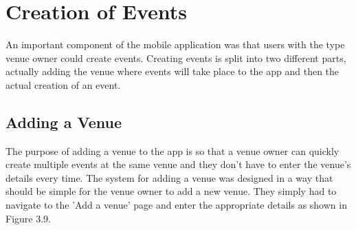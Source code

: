 \section{Creation of Events}
An important component of the mobile application was that users with the type venue owner could create events. Creating events is split into two different parts, actually adding the venue where events will take place to the app and then the actual creation of an event.

\subsection{Adding a Venue}
The purpose of adding a venue to the app is so that a venue owner can quickly create multiple events at the same venue and they don't have to enter the venue's details every time. The system for adding a venue was designed in a way that should be simple for the venue owner to add a new venue. They simply had to navigate to the 'Add a venue' page and enter the appropriate details as shown in Figure 3.9. 

